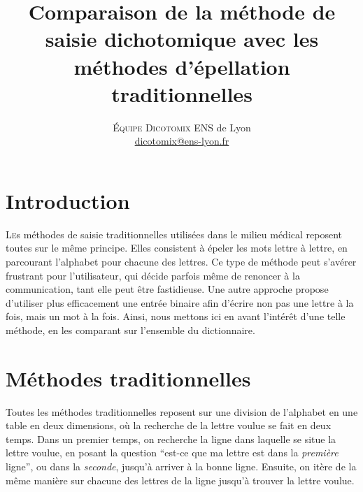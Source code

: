 \documentclass[twoside,twocolumn]{article}
\title{Comparaison de la méthode de saisie dichotomique avec les méthodes d'épellation traditionnelles} %
\author{%
\textsc{Équipe Dicotomix}
\normalsize ENS de Lyon \\ %
\normalsize \href{mailto:dicotomix@ens-lyon.fr}{dicotomix@ens-lyon.fr} %
}
\date{} %
\begin{document}
\maketitle


\section{Introduction}

\lettrine[nindent=0em,lines=3]{L}es méthodes de saisie traditionnelles utilisées dans le milieu médical reposent toutes sur le même principe. Elles consistent à épeler les mots lettre à lettre, en parcourant l'alphabet pour chacune des lettres. Ce type de méthode peut s'avérer frustrant pour l'utilisateur, qui décide parfois même de renoncer à la communication, tant elle peut être fastidieuse. Une autre approche propose d'utiliser plus efficacement une entrée binaire afin d'écrire non pas une lettre à la fois, mais un mot à la fois. Ainsi, nous mettons ici en avant l'intérêt d'une telle méthode, en les comparant sur l'ensemble du dictionnaire.


\section{Méthodes traditionnelles}

Toutes les méthodes traditionnelles reposent sur une division de l'alphabet en une table en deux dimensions, où la recherche de la lettre voulue se fait en deux temps. Dans un premier temps, on recherche la ligne dans laquelle se situe la lettre voulue, en posant la question ``est-ce que ma lettre est dans la \textit{première} ligne'', ou dans la \textit{seconde}, jusqu'à arriver à la bonne ligne. Ensuite, on itère de la même manière sur chacune des lettres de la ligne jusqu'à trouver la lettre voulue.
\end{document}
